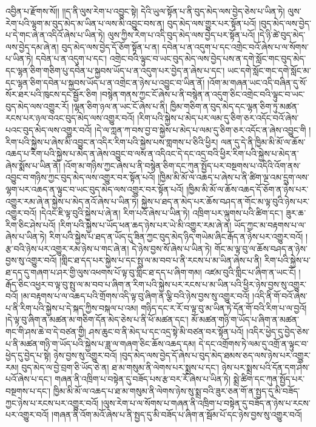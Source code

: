 འབྱིན་པ་རྫོགས་སོ།། །།ད་ནི་ལུས་རེག་པ་འབྱུང་སྟེ། དེའི་ཡུལ་སྟོན་པ་ནི་བུད་མེད་ལས་བྱེད་ཅེས་པ་ཡིན་ཏེ། ལུས་རེག་པའི་ལྷག་མ་བུད་མེད་མ་ཡིན་པ་ལས་མི་འབྱུང་བས་ན། བུད་མེད་ལས་གྱུར་པར་སྟོན་པའོ། །བུད་མེད་ལས་བྱེད་པ་དེ་གང་ཞེ་ན་འདིའོ་ཞེས་པ་ཡིན་ཏེ། ལུས་ཀྱིས་རེག་པ་འདི་བུད་མེད་ལས་བྱེད་པར་སྟོན་པའོ། །དེ་ཉི་ཚེ་བུད་མེད་ལས་བྱེད་དམ་ཞེ་ན། བུད་མེད་ལས་བྱེད་དོ་ཅོག་སྟོན་པ་ན། དབེན་པ་ན་འདུག་པ་དང་འགྲེང་བའོ་ཞེས་པ་ལ་སོགས་པ་ཡིན་ཏེ། དབེན་པ་ན་འདུག་པ་དང་། འགྲེང་བའི་ལྟུང་བ་ཡང་བུད་མེད་ལས་བྱེད་པས་ན་དགེ་སློང་གང་བུད་མེད་དང་ལྷན་ཅིག་གཅིག་པུ་དབེན་པ་སྐྱབས་ཡོད་པ་ན་འདུག་པར་བྱེད་ན་ཞེས་པ་དང་། ཡང་དགེ་སློང་གང་དགེ་སློང་མ་དང་ལྷན་ཅིག་དབེན་པ་སྐྱབས་ཡོད་པ་ན་འགྲེང་ན་ཉེས་པ་འབྱུང་བ་ཡིན་ནོ། །འོག་མ་གཞན་ཡང་འདི་བཞིན་དུ་སོ་སོར་ཐར་པའི་ཁུངས་དང་སྦྱོར་ཅིག །བསྙེན་གནས་ཀྱང་ངོ་ཞེས་པ་ནི་བསྙེན་ན་འདུག་ཅིང་འགྲེང་བའི་ལྟུང་བ་ཡང་བུད་མེད་ལས་འགྱུར་རོ། །ལྷན་ཅིག་ཉལ་ན་ཡང་ངོ་ཞེས་པ་ནི། ཁྱིམ་གཅིག་ན་བུད་མེད་དང་ལྷན་ཅིག་ཏུ་མཚན་རངས་པར་ཉལ་བའང་བུད་མེད་ལས་འགྱུར་བའོ། །རིག་པའི་སྐྱེས་པ་མེད་པར་ལམ་དུ་ཅིག་ཅར་འདོང་བའོ་ཞེས་པའང་བུད་མེད་ལས་འགྱུར་བའོ། །དེ་ལ་ཀླན་ཀ་བས་བྱ་བ་སྐྱེས་པ་མེད་པ་ལམ་དུ་ཅིག་ཅར་འདོང་ན་ཞེས་འབྱུང་གི །རིག་པའི་སྐྱེས་པ་ཞེས་མི་འབྱུང་ན་འདིར་རིག་པའི་སྐྱེས་པས་གླགས་པ་ཅིའི་ཕྱིར། ལན་དུ་དེ་ནི་ཁྱིམ་མི་མོ་ལ་ཆོས་འཆད་པ་རིག་པའི་སྐྱེས་པ་མེད་ན་ཞེས་འབྱུང་བ་ལས་ན་འདིའང་དེ་དང་འདྲ་བའི་ཕྱིར་རིག་པའི་སྐྱེས་པ་མེད་ན་ཞེས་སྨོས་པ་ཡིན་ནོ། །འོག་མ་གཉིས་ཀྱང་ཞེས་པ་ནི་བསྙེན་ཅིག་དང་ཀུན་སྤྱོད་པར་བསྔགས་པ་འདིའི་འོག་ནས་འབྱུང་བ་གཉིས་ཀྱང་བུད་མེད་ལས་འགྱུར་བར་སྟོན་པའོ། །ཁྱིམ་མི་མོ་ལ་འཆད་པ་ཞེས་པ་ནི་ཚིག་ལྔ་འམ་དྲུག་ལས་ལྷག་པར་འཆད་ན་ལྟུང་བ་ཡང་བུད་མེད་ལས་འགྱུར་བར་སྟོན་པའོ། །ཁྱིམ་མི་མོ་ལ་ཆོས་འཆད་དོ་ཅོག་ན་ཉེས་པར་འགྱུར་རམ་ཞེ་ན་སྐྱེས་པ་མེད་ནའོ་ཞེས་པ་ཡིན་ཏེ། སྐྱེས་པ་ཐད་ན་མེད་པར་ཆོས་བཤད་ན་གོང་མ་ལྟ་བུའི་ཉེས་པར་འགྱུར་བའོ། །དེའང་ཇི་ལྟ་བུའི་སྐྱེས་པ་ཞེ་ན། རིག་པའོ་ཞེས་པ་ཡིན་ཏེ། འཁྲིག་པར་ལྐུགས་པའི་ཚིག་དང་། ཟུར་ཆ་རིག་ཅིང་ཤེས་པའོ། །རིག་པའི་སྐྱེས་པ་ཡོད་ཕན་ཆད་ཉེས་པར་ཡེ་མི་འགྱུར་རམ་ཞེ་ན། ཡོད་ཀྱང་མ་བརྟགས་པ་ལ་ཞེས་པ་ཡིན་ཏེ། རིག་པའི་སྐྱེས་པ་ཐད་ན་ཡོད་དུ་ཟིན་ཀྱང་བུད་མེད་ཉིད་གཡེམ་ཞིང་རྒོད་ན་ཉེས་པར་འགྱུར་བའོ། །རྩ་བའི་ཉེས་པར་འགྱུར་རམ་ཉེས་པ་གང་ཞེ་ན། དེ་ཉེས་བྱས་སོ་ཞེས་པ་ཡིན་ཏེ། གོང་མ་ལྟ་བུ་ལ་ཆོས་བཤད་ན་ཉེས་བྱས་སུ་འགྱུར་བའོ། །གླིང་ཐ་དད་པར་སྐྱེས་པ་དང་སྤུ་ལ་མ་བབ་པ་ནི་རངས་པ་མ་ཡིན་ཞེས་པ་ནི། རིག་པའི་སྐྱེས་པ་ཐ་དད་དུ་གཞག་པ་ཤར་གྱི་ལུས་འཕགས་པོ་ལྟ་བུ་གླིང་ཐ་དད་པ་ཞིག་གམ། འཛམ་བུའི་གླིང་པ་ཞིག་ན་ཡང་ངོ། །རྒོད་ཅིང་འཕྱར་བ་ལྟ་བུ་སྤུ་ལ་མ་བབ་པ་ཞིག་ན་རིག་པའི་སྐྱེས་པར་རངས་པ་མ་ཡིན་པའི་ཕྱིར་ཉེས་བྱས་སུ་འགྱུར་བའོ། །མ་བརྟགས་པ་ལ་འཆད་པའི་གྲོགས་འདི་ལྟ་བུ་ཞིག་ན་ལྕི་བའི་ཉེས་བྱས་སུ་འགྱུར་བའོ། །འདི་ནི་གོ་བའོ་ཞེས་པ་ནི་རིག་པའི་སྐྱེས་པ་དེ་སྐད་ཀྱིས་བསྐལ་པ་འམ། གཉིད་དང་ར་རོ་བ་ལྟ་བུ་མ་ཡིན་ཏེ་དོན་གོ་བའི་རིག་པ་ལ་བྱའོ། །དེ་ལྟ་བུ་ཞིག་ན་མཚན་མ་གཅིག་དོན་མེད་ཅེས་པ་ནི་ཕོ་མཚན་དང་། མོ་མཚན་གཉི་ག་ཡོད་པ་ཞིག་ན་མཚན་གང་གི་ཤས་ཆེ་བ་དེ་བཙན་གྱི། ཤས་ཆུང་བ་ནི་མེད་པ་དང་འདྲ་སྟེ་མི་བཙན་བར་སྟོན་པའོ། །འདིར་ཕྱེད་དུ་བྱེད་ཅེས་པ་ནི་མཚན་གཉི་ག་ཡོད་པའི་སྐྱེས་པ་ཟླ་ལ་གཞག་ཅིང་ཆོས་འཆད་དམ། དེ་དང་འགྲོགས་ཏེ་ལམ་དུ་འགྲོ་ན་ལྟུང་བ་ཕྱེད་དུ་བྱེད་པ་སྟེ། ཉེས་བྱས་སུ་འགྱུར་བའོ། །བུད་མེད་ལས་བྱེད་དོ་ཞེས་པ་བུད་མེད་ཐམས་ཅད་ལས་ཉེས་པར་འགྱུར་རམ། བུད་མེད་ལ་བྱེ་བྲག་ཅི་ཡོད་ཅེ་ན། ཐ་མ་གསུམ་ནི་ལེགས་པར་སྨྲས་པ་དང་། ཉེས་པར་སྨྲས་པའི་དོན་དག་ཤེས་པའོ་ཞེས་པ་དང་། གཞན་ནི་འཁྲིག་པ་བསྟེན་དུ་བཟོད་པས་རྩ་བར་རོ་ཞེས་པ་ཡིན་ཏེ། སྨྲེ་ཚིག་དང་ཀུན་སྤྱོད་པར་བསྔགས་པ་དང་། ཁྱིམ་མི་མོ་ལ་འཆད་པ་ཐ་མ་གསུམ་ནི་ལེགས་ཉེས་སུ་སྨྲ་བའི་ཟུར་ཅན་གོ་ན་སྤྱད་དུ་མི་བཟོད་ཀྱང་ཉེས་པ་རངས་པར་འགྱུར་བའོ། །ལུས་རེག་པ་ལ་སོགས་པ་གཞན་ནི་འཁྲིག་པ་བསྟེན་དུ་བཟོད་ན་ཉེས་པ་རངས་པར་འགྱུར་བའོ། །གཞན་ནི་འོག་མའོ་ཞེས་པ་ནི་སྤྱད་དུ་མི་བཟོད་པ་ཞིག་ན་སྦོམ་པོ་དང་ཉེས་བྱས་སུ་འགྱུར་བའོ། 
